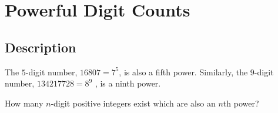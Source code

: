 \section{Powerful Digit Counts}
\subsection{Description}
The \( 5 \)-digit number, \( 16807=7^5 \), is also a fifth power. Similarly, the \( 9 \)-digit number, \( 134217728=8^9 \) , is a ninth power.

How many \( n \)-digit positive integers exist which are also an \( n \)th power?
